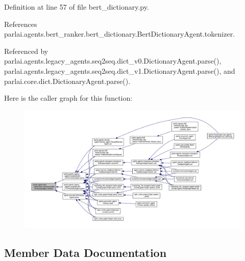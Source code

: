 Definition at line 57 of file bert\+\_\+dictionary.\+py.



References parlai.\+agents.\+bert\+\_\+ranker.\+bert\+\_\+dictionary.\+Bert\+Dictionary\+Agent.\+tokenizer.



Referenced by parlai.\+agents.\+legacy\+\_\+agents.\+seq2seq.\+dict\+\_\+v0.\+Dictionary\+Agent.\+parse(), parlai.\+agents.\+legacy\+\_\+agents.\+seq2seq.\+dict\+\_\+v1.\+Dictionary\+Agent.\+parse(), and parlai.\+core.\+dict.\+Dictionary\+Agent.\+parse().

Here is the caller graph for this function\+:
\nopagebreak
\begin{figure}[H]
\begin{center}
\leavevmode
\includegraphics[width=350pt]{classparlai_1_1agents_1_1bert__ranker_1_1bert__dictionary_1_1BertDictionaryAgent_a6269b15dc01bfaac5dd1b5da995f2f0f_icgraph}
\end{center}
\end{figure}


\subsection{Member Data Documentation}
\mbox{\label{classparlai_1_1agents_1_1bert__ranker_1_1bert__dictionary_1_1BertDictionaryAgent_a108b974b0f3048fc15aafd83cd0774f6}} 
